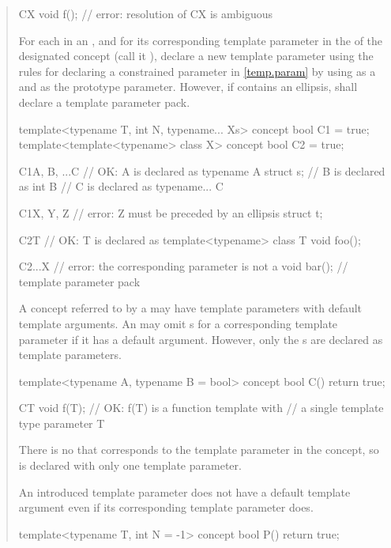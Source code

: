 \begin{quote}
\begin{codeblock}
C{X} void f(); // error: resolution of C{X} is ambiguous
\end{codeblock}
\exitexample

\pnum
For each   in an
,
and for its corresponding template parameter in the 
of the designated concept (call it ), declare a new template 
parameter using the rules for declaring a constrained parameter in
\ref{temp.param} by using  as a
 and 
as the prototype parameter.
% 
However, if  contains an ellipsis,  shall
declare a template parameter pack.
% 
\enterexample
\begin{codeblock}
template<typename T, int N, typename... Xs> concept bool C1 = true;
template<template<typename> class X> concept bool C2 = true;

C1{A, B, ...C} // OK: A is declared as typename A
  struct s;    // B is declared as int B
               // C is declared as typename... C

C1{X, Y, Z} // error: Z must be preceded by an ellipsis
  struct t;

C2{T} // OK: T is declared as template<typename> class T
  void foo();

C2{...X}      // error: the corresponding parameter is not a 
  void bar(); // template parameter pack
\end{codeblock}
\exitexample

\pnum
\enternote
A concept referred to by a  
may have template parameters with default template arguments. An
 may omit 
s for a corresponding template
parameter if it has a default argument. However, only the
s are declared
as template parameters. 
% 
\enterexample
\begin{codeblock}
template<typename A, typename B = bool> 
  concept bool C() { return true; }

C{T} void f(T); // OK: f(T) is a function template with
                // a single template type parameter T
\end{codeblock}
There is no  
that corresponds to the template parameter  in the
 concept, so  is declared with only
one template parameter.
\exitexample
\exitnote
    
\pnum
An introduced template parameter does not have a default template 
argument even if its corresponding template parameter does.
% 
\enterexample
\begin{codeblock}
template<typename T, int N = -1> concept bool P() { return true; }


\end{codeblock}
\end{quote}
